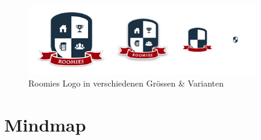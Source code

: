 \begin{figure}[H]
	\centering
	\includegraphics[width=10cm]{content/images/logo-variants.png}
	\caption{Roomies Logo in verschiedenen Grössen \& Varianten}
\end{figure}


\section{Mindmap}
